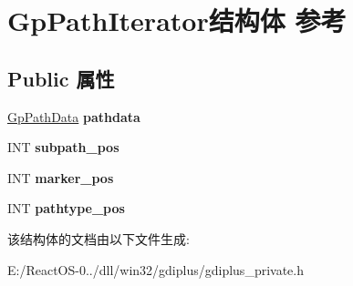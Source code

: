 \hypertarget{struct_gp_path_iterator}{}\section{Gp\+Path\+Iterator结构体 参考}
\label{struct_gp_path_iterator}
\subsection*{Public 属性}
\begin{DoxyCompactItemize}
\item 
\mbox{\label{struct_gp_path_iterator_a0c1897847bb0469e88384548a16f8917}} 
\hyperlink{struct_path_data}{Gp\+Path\+Data} {\bfseries pathdata}
\item 
\mbox{\label{struct_gp_path_iterator_a8717fbea318f8919f20e63dd906b4409}} 
I\+NT {\bfseries subpath\+\_\+pos}
\item 
\mbox{\label{struct_gp_path_iterator_a146e7179e1c421511d9cea61c2c9b2e4}} 
I\+NT {\bfseries marker\+\_\+pos}
\item 
\mbox{\label{struct_gp_path_iterator_aa1d05f702c86d561ff14e5bc9567ab16}} 
I\+NT {\bfseries pathtype\+\_\+pos}
\end{DoxyCompactItemize}


该结构体的文档由以下文件生成\+:\begin{DoxyCompactItemize}
\item 
E\+:/\+React\+O\+S-\/0../dll/win32/gdiplus/gdiplus\+\_\+private.\+h\end{DoxyCompactItemize}
